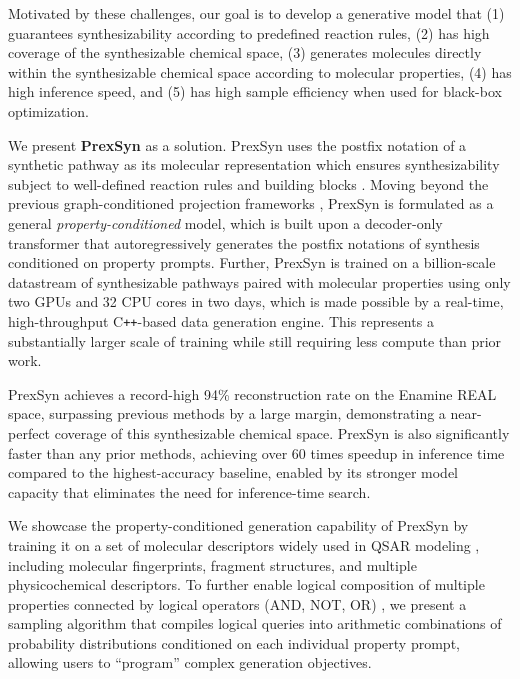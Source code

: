 Motivated by these challenges, our goal is to develop a generative model that (1) guarantees synthesizability according to predefined reaction rules, (2) has high coverage of the synthesizable chemical space, (3) generates molecules directly within the synthesizable chemical space according to molecular properties, (4) has high inference speed, and (5) has high sample efficiency when used for black-box optimization.


We present \textbf{PrexSyn} as a solution.
PrexSyn uses the postfix notation of a synthetic pathway as its molecular representation which ensures synthesizability subject to well-defined reaction rules and building blocks \citep{luo2024projecting}.
Moving beyond the previous graph-conditioned projection frameworks \citep{luo2024projecting,gao2025generative,lee2025rethinking}, PrexSyn is formulated as a general \textit{property-conditioned} model, which is built upon a decoder-only transformer that autoregressively generates the postfix notations of synthesis conditioned on property prompts. Further, 
PrexSyn is trained on a billion-scale datastream of synthesizable pathways paired with molecular properties using only two GPUs and 32 CPU cores in two days, which is made possible by a real-time, high-throughput C\texttt{++}-based data generation engine. This represents a substantially larger scale of training while still requiring less compute than prior work.

PrexSyn achieves a record-high 94\% reconstruction rate on the Enamine REAL space, surpassing previous methods by a large margin, demonstrating a near-perfect coverage of this synthesizable chemical space.
PrexSyn is also significantly faster than any prior methods, achieving over 60 times speedup in inference time compared to the highest-accuracy baseline, enabled by its stronger model capacity that eliminates the need for inference-time search.

We showcase the property-conditioned generation capability of PrexSyn by training it on a set of molecular descriptors widely used in QSAR modeling \citep{roy2015qsarbook}, including molecular fingerprints, fragment structures, and multiple physicochemical descriptors.
To further enable logical composition of multiple properties connected by logical operators (AND, NOT, OR) \citep{du2020compositional}, we present a sampling algorithm that compiles logical queries into arithmetic combinations of probability distributions conditioned on each individual property prompt, allowing users to ``program'' complex generation objectives. 

